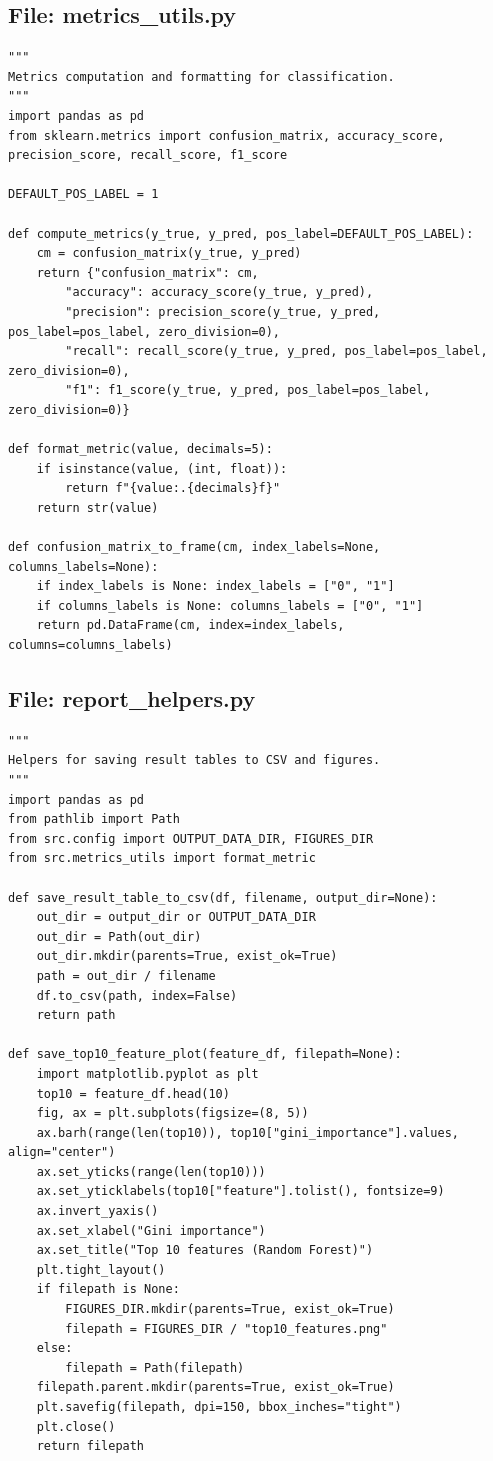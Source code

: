 \documentclass[11pt]{article}
\begin{document}
\subsection*{File: metrics\_utils.py}

\begin{lstlisting}[style=pythonstyle]
"""
Metrics computation and formatting for classification.
"""
import pandas as pd
from sklearn.metrics import confusion_matrix, accuracy_score, precision_score, recall_score, f1_score

DEFAULT_POS_LABEL = 1

def compute_metrics(y_true, y_pred, pos_label=DEFAULT_POS_LABEL):
    cm = confusion_matrix(y_true, y_pred)
    return {"confusion_matrix": cm,
        "accuracy": accuracy_score(y_true, y_pred),
        "precision": precision_score(y_true, y_pred, pos_label=pos_label, zero_division=0),
        "recall": recall_score(y_true, y_pred, pos_label=pos_label, zero_division=0),
        "f1": f1_score(y_true, y_pred, pos_label=pos_label, zero_division=0)}

def format_metric(value, decimals=5):
    if isinstance(value, (int, float)):
        return f"{value:.{decimals}f}"
    return str(value)

def confusion_matrix_to_frame(cm, index_labels=None, columns_labels=None):
    if index_labels is None: index_labels = ["0", "1"]
    if columns_labels is None: columns_labels = ["0", "1"]
    return pd.DataFrame(cm, index=index_labels, columns=columns_labels)
\end{lstlisting}

\subsection*{File: report\_helpers.py}

\begin{lstlisting}[style=pythonstyle]
"""
Helpers for saving result tables to CSV and figures.
"""
import pandas as pd
from pathlib import Path
from src.config import OUTPUT_DATA_DIR, FIGURES_DIR
from src.metrics_utils import format_metric

def save_result_table_to_csv(df, filename, output_dir=None):
    out_dir = output_dir or OUTPUT_DATA_DIR
    out_dir = Path(out_dir)
    out_dir.mkdir(parents=True, exist_ok=True)
    path = out_dir / filename
    df.to_csv(path, index=False)
    return path

def save_top10_feature_plot(feature_df, filepath=None):
    import matplotlib.pyplot as plt
    top10 = feature_df.head(10)
    fig, ax = plt.subplots(figsize=(8, 5))
    ax.barh(range(len(top10)), top10["gini_importance"].values, align="center")
    ax.set_yticks(range(len(top10)))
    ax.set_yticklabels(top10["feature"].tolist(), fontsize=9)
    ax.invert_yaxis()
    ax.set_xlabel("Gini importance")
    ax.set_title("Top 10 features (Random Forest)")
    plt.tight_layout()
    if filepath is None:
        FIGURES_DIR.mkdir(parents=True, exist_ok=True)
        filepath = FIGURES_DIR / "top10_features.png"
    else:
        filepath = Path(filepath)
    filepath.parent.mkdir(parents=True, exist_ok=True)
    plt.savefig(filepath, dpi=150, bbox_inches="tight")
    plt.close()
    return filepath
\end{lstlisting}
\end{document}
